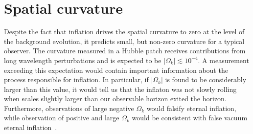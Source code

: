 \section{Spatial curvature}
\label{sec:curvature}

Despite the fact that inflation drives the spatial curvature to zero at the level of the background evolution, it predicts small, but non-zero curvature for a typical observer. The curvature measured in a Hubble patch receives contributions from long wavelength perturbations and is expected to be $|\Omega_k|\lesssim10^{-4}$. A measurement exceeding this expectation would contain important information about the process responsible for inflation. In particular, if $|\Omega_k|$ is found to be considerably larger than this value, it would tell us that the inflaton was not slowly rolling when scales slightly larger than our observable horizon exited the horizon. Furthermore, observations of large negative $\Omega_k$ would falsify eternal inflation, while observation of positive and large $\Omega_k$ would be consistent with false vacuum eternal inflation~\cite{Guth:2012ww,Kleban:2012ph}.

